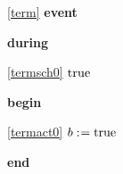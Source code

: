 \noindent \ref{term}  \textbf{event}
\begin{block}
  \item   \textbf{during}
  \begin{block}
  \item[ \eqref{termsch0} ]$\text{true} $ %
  \end{block}
  \item   \textbf{begin}
  \begin{block}
  \item[ \eqref{termact0} ]$b \mathrel{:\mkern1mu=} \text{true} $ %
  \end{block}
  \item   \textbf{end} \\
\end{block}
